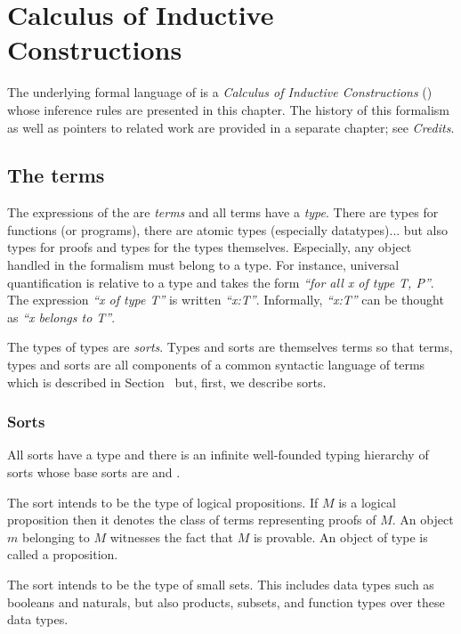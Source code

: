 \chapter[Calculus of Inductive Constructions]{Calculus of Inductive Constructions
\label{Cic}
}

The underlying formal language of {\Coq} is a {\em Calculus of
Inductive Constructions} (\CIC) whose inference rules are presented in
this chapter. The history of this formalism as well as pointers to related work
are provided in a separate chapter; see {\em Credits}.

\section[The terms]{The terms\label{Terms}}

The expressions of the {\CIC} are {\em terms} and all terms have a {\em type}.
There are types for functions (or
programs), there are atomic types (especially datatypes)... but also
types for proofs and types for the types themselves.
Especially, any object handled in the formalism must belong to a
type.  For instance, universal quantification is relative to a type and
takes the form {\it ``for all x
of type T, P''}. The expression {\it ``x of type T''} is
written {\it ``x:T''}. Informally, {\it ``x:T''} can be thought as
{\it ``x belongs to T''}.

The types of types are {\em sorts}. Types and sorts are themselves
terms so that terms, types and sorts are all components of a common
syntactic language of terms which is described in
Section~\label{cic:terms} but, first, we describe sorts.

\subsection[Sorts]{Sorts\label{Sorts}
}
All sorts have a type and there is an infinite well-founded
typing hierarchy of sorts whose base sorts are {\Prop} and {\Set}.

The sort {\Prop} intends to be the type of logical propositions. If
$M$ is a logical proposition then it denotes the class of terms
representing proofs of $M$. An object $m$ belonging to $M$ witnesses
the fact that $M$ is provable. An object of type {\Prop} is called a
proposition.

The sort {\Set} intends to be the type of small sets. This includes data
types such as booleans and naturals, but also products, subsets, and
function types over these data types.

